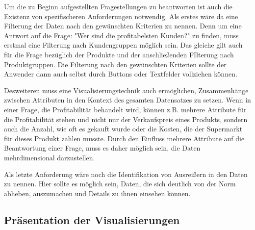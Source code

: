 \documentclass[usegeometry=true]{scrartcl}
\begin{document}
\noindent Um die zu Beginn aufgestellten Fragestellungen zu beantworten ist auch die Existenz von spezifischeren Anforderungen notwendig. Als erstes wäre da eine Filterung der
Daten nach den gewünschten Kriterien zu nennen. Denn um eine Antwort auf die Frage: "Wer sind die profitabelsten Kunden?" zu finden, muss erstmal eine Filterung nach Kundengruppen
möglich sein. Das gleiche gilt auch für die Frage bezüglich der Produkte und der anschließenden FIlterung nach Produktgruppen. Die Filterung nach den gewünschten Kriterien
sollte der Anwender dann auch selbst durch Buttons oder Textfelder vollziehen können.

\noindent Desweiteren muss eine Visualisierungstechnik auch ermöglichen, Zusammenhänge zwischen Attributen in den Kontext des gesamten Datensatzes zu setzen. Wenn in einer Frage,
die Profitabilität behandelt wird, können z.B. mehrere Attribute für die Profitabilität stehen und nicht nur der Verkaufspreis eines Produkts, sondern auch die
Anzahl, wie oft es gekauft wurde oder die Kosten, die der Supermarkt für dieses Produkt zahlen musste. Durch den Einfluss mehrere Attribute auf die Beantwortung einer Frage, muss
es daher möglich sein, die Daten mehrdimensional darzustellen.

\noindent Als letzte Anforderung wäre noch die Identifikation von Ausreißern in den Daten zu nennen. Hier sollte es möglich sein, Daten, die sich deutlich von der Norm abheben,
auszumachen und Details zu ihnen einsehen können.

\subsection{Präsentation der Visualisierungen}
\end{document}
